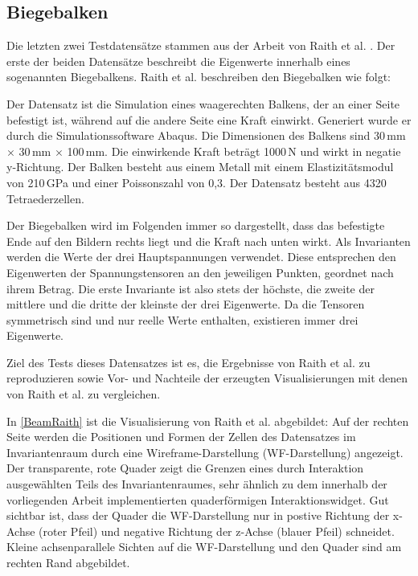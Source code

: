\documentclass[a4paper,fontsize=12pt,toc=bib,parskip=half,ngerman]{scrartcl}
\begin{document}
\subsection{Biegebalken}
Die letzten zwei Testdatens\"atze stammen aus der Arbeit von Raith et al. \cite{raith2019tensor}. Der erste der beiden Datens\"atze beschreibt die Eigenwerte innerhalb eines sogenannten Biegebalkens. Raith et al. beschreiben den Biegebalken wie folgt\cite[S.~1128]{raith2019tensor}: 

Der Datensatz ist die Simulation eines waagerechten Balkens, der an einer Seite befestigt ist, w\"ahrend auf die andere Seite eine Kraft einwirkt. Generiert wurde er durch die Simulationssoftware Abaqus\cite{abaqusWebsite}. Die Dimensionen des Balkens sind 30\,mm $\times$ 30\,mm $\times$ 100\,mm. Die einwirkende Kraft betr\"agt 1000\,N und wirkt in negatie y-Richtung. Der Balken besteht aus einem Metall mit einem Elastizit\"atsmodul von 210\,GPa und einer Poissonszahl von 0,3. Der Datensatz besteht aus 4320 Tetraederzellen.

Der Biegebalken wird im Folgenden immer so dargestellt, dass das befestigte Ende auf den Bildern rechts liegt und die Kraft nach unten wirkt. Als Invarianten werden die Werte der drei Hauptspannungen verwendet. Diese entsprechen den Eigenwerten der Spannungstensoren an den jeweiligen Punkten, geordnet nach ihrem Betrag. Die erste Invariante ist also stets der h\"ochste, die zweite der mittlere und die dritte der kleinste der drei Eigenwerte. Da die Tensoren symmetrisch sind und nur reelle Werte enthalten, existieren immer drei Eigenwerte.

Ziel des Tests dieses Datensatzes ist es, die Ergebnisse von Raith et al. zu reproduzieren sowie Vor- und Nachteile der erzeugten Visualisierungen mit denen von Raith et al. zu vergleichen.

In \cref{BeamRaith} ist die Visualisierung von Raith et al. abgebildet: Auf der rechten Seite werden die Positionen und Formen der Zellen des Datensatzes im Invariantenraum durch eine Wireframe-Darstellung (WF-Darstellung) angezeigt. Der transparente, rote Quader zeigt die Grenzen eines durch Interaktion ausgew\"ahlten Teils des Invariantenraumes, sehr \"ahnlich zu dem innerhalb der vorliegenden Arbeit implementierten quaderf\"ormigen Interaktionswidget. Gut sichtbar ist, dass der Quader die WF-Darstellung nur in postive Richtung der x-Achse (roter Pfeil) und negative Richtung der z-Achse (blauer Pfeil) schneidet. Kleine achsenparallele Sichten auf die WF-Darstellung und den Quader sind am rechten Rand abgebildet.
\end{document}
